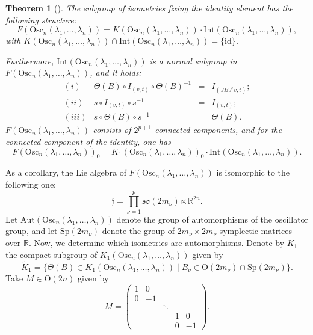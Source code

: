 \documentclass[12pt]{amsart}
\theoremstyle{plain}
\newtheorem{thm}{Theorem}[section]
\theoremstyle{definition}
\theoremstyle{remark}
\begin{document}
\begin{thm}[\cite{Bou}] \label{Bou}
    The subgroup of isometries fixing the identity element has the following structure:
    \[
    F(\text{Osc}_n(\lambda_1, \ldots, \lambda_n)) = K(\text{Osc}_n(\lambda_1, \ldots, \lambda_n)) \cdot \text{Int}(\text{Osc}_n(\lambda_1, \ldots, \lambda_n)),
    \]
    with \( K(\text{Osc}_n(\lambda_1, \ldots, \lambda_n)) \cap \text{Int}(\text{Osc}_n(\lambda_1, \ldots, \lambda_n)) = \{ \text{id} \} \).
    
    Furthermore, \( \text{Int}(\text{Osc}_n(\lambda_1, \ldots, \lambda_n)) \) is a normal subgroup in \( F(\text{Osc}_n(\lambda_1, \ldots, \lambda_n)) \), and it holds:
    \[
    \begin{array}{crcl}
        (i) & \Theta(B) \circ I_{(v,t)} \circ \Theta(B)^{-1} & = & I_{(JBJ^{\tau}v, t)};\\
        (ii) & s \circ I_{(v,t)} \circ s^{-1} & = & I_{(v,t)};\\
        (iii) & s \circ \Theta(B) \circ s^{-1} & = & \Theta(B).
    \end{array}
    \]
    \( F(\text{Osc}_n(\lambda_1, \ldots, \lambda_n)) \) consists of \( 2^{p+1} \) connected components, and for the connected component of the identity, one has
    \[
    F(\text{Osc}_n(\lambda_1, \ldots, \lambda_n))_0 = K_1(\text{Osc}_n(\lambda_1, \ldots, \lambda_n))_0 \cdot \text{Int}(\text{Osc}_n(\lambda_1, \ldots, \lambda_n)).
    \]
\end{thm}

As a corollary, the Lie algebra of \( F(\text{Osc}_n(\lambda_1, \ldots, \lambda_n)) \) is isomorphic to the following one:
\[
\mathfrak{f} = \prod_{\nu=1}^p \mathfrak{so}(2m_{\nu}) \ltimes \mathbb{R}^{2n}.
\]
Let \( \text{Aut}(\text{Osc}_n(\lambda_1, \ldots, \lambda_n)) \) denote the group of automorphisms of the oscillator group, and let \( \text{Sp}(2m_{\nu}) \) denote the group of \( 2m_{\nu} \times 2m_{\nu} \)-symplectic matrices over \( \mathbb{R} \). Now, we determine which isometries are automorphisms. Denote by \( \tilde{K}_1 \) the compact subgroup of \( K_1(\text{Osc}_n(\lambda_1, \ldots, \lambda_n)) \) given by 
\[
\tilde{K}_1 = \{\Theta(B) \in K_1(\text{Osc}_n(\lambda_1, \ldots, \lambda_n)) \mid B_{\nu} \in \mathrm{O}(2m_{\nu}) \cap \text{Sp}(2m_{\nu})\}.
\]
Take \( M \in \mathrm{O}(2n) \) given by
\[
M = \left( \begin{matrix}
1 & 0 & & & \\
0 & -1 & & & \\
& & \ddots & & \\
& & & 1 & 0 \\
& & & 0 & -1
\end{matrix}
\right).
\]
\end{document}
